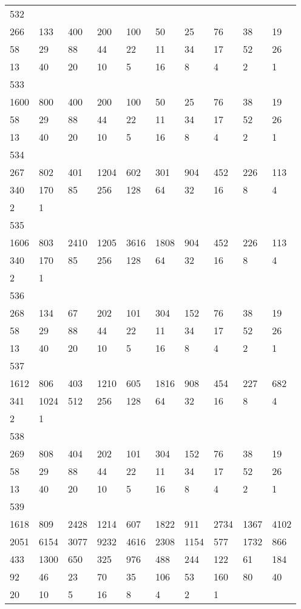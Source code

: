 \begin{longtable}{*{10}{l}}
532&&&&&&&&&\\
266& 133& 400& 200& 100& 50& 25& 76& 38& 19\\
58& 29& 88& 44& 22& 11& 34& 17& 52& 26\\
13& 40& 20& 10& 5& 16& 8& 4& 2& 1\\

533&&&&&&&&&\\
1600& 800& 400& 200& 100& 50& 25& 76& 38& 19\\
58& 29& 88& 44& 22& 11& 34& 17& 52& 26\\
13& 40& 20& 10& 5& 16& 8& 4& 2& 1\\

534&&&&&&&&&\\
267& 802& 401& 1204& 602& 301& 904& 452& 226& 113\\
340& 170& 85& 256& 128& 64& 32& 16& 8& 4\\
2& 1& \\

535&&&&&&&&&\\
1606& 803& 2410& 1205& 3616& 1808& 904& 452& 226& 113\\
340& 170& 85& 256& 128& 64& 32& 16& 8& 4\\
2& 1& \\

536&&&&&&&&&\\
268& 134& 67& 202& 101& 304& 152& 76& 38& 19\\
58& 29& 88& 44& 22& 11& 34& 17& 52& 26\\
13& 40& 20& 10& 5& 16& 8& 4& 2& 1\\

537&&&&&&&&&\\
1612& 806& 403& 1210& 605& 1816& 908& 454& 227& 682\\
341& 1024& 512& 256& 128& 64& 32& 16& 8& 4\\
2& 1& \\

538&&&&&&&&&\\
269& 808& 404& 202& 101& 304& 152& 76& 38& 19\\
58& 29& 88& 44& 22& 11& 34& 17& 52& 26\\
13& 40& 20& 10& 5& 16& 8& 4& 2& 1\\

539&&&&&&&&&\\
1618& 809& 2428& 1214& 607& 1822& 911& 2734& 1367& 4102\\
2051& 6154& 3077& 9232& 4616& 2308& 1154& 577& 1732& 866\\
433& 1300& 650& 325& 976& 488& 244& 122& 61& 184\\
92& 46& 23& 70& 35& 106& 53& 160& 80& 40\\
20& 10& 5& 16& 8& 4& 2& 1& \\


\end{longtable}
